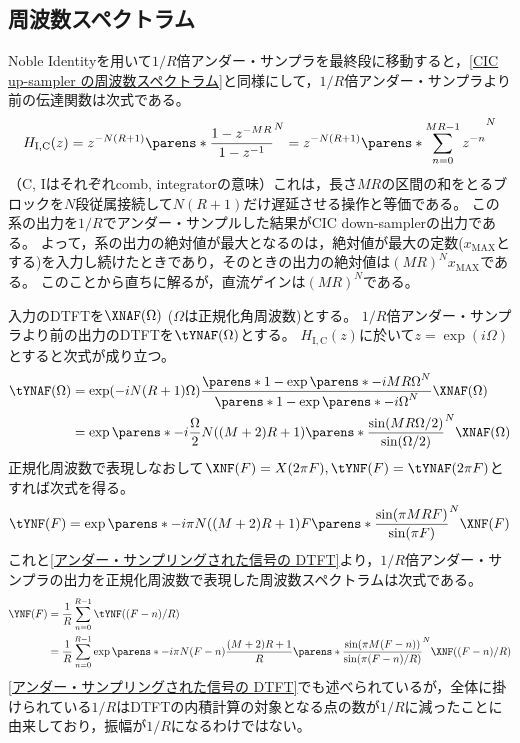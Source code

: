     \subsection{周波数スペクトラム}
        Noble Identityを用いて$1/R$倍アンダー・サンプラを最終段に移動すると，\ref{CIC up-sampler の周波数スペクトラム}と同様にして，$1/R$倍アンダー・サンプラより前の伝達関数は次式である。
        \[ H_\mathrm{I,C}(z) = z^{-N(R+1)}\parens*{\frac{1-z^{-MR}}{1-z^{-1}}}^N = z^{-N(R+1)}\parens*{\sum_{n=0}^{MR-1}z^{-n}}^N \]
        （C, Iはそれぞれcomb, integratorの意味）これは，長さ$MR$の区間の和をとるブロックを$N$段従属接続して$N(R+1)$だけ遅延させる操作と等価である。
        この系の出力を$1/R$でアンダー・サンプルした結果がCIC down-samplerの出力である。
        よって，系の出力の絶対値が最大となるのは，絶対値が最大の定数($x_\mathrm{MAX}$とする)を入力し続けたときであり，そのときの出力の絶対値は$(MR)^N x_\mathrm{MAX}$である。
        このことから直ちに解るが，直流ゲインは$(MR)^N$である。
        \par
        入力のDTFTを$\XNAF(\Omega)$ ($\Omega$は正規化角周波数)とする。
        $1/R$倍アンダー・サンプラより前の出力のDTFTを$\tYNAF(\Omega)$とする。
        $H_\mathrm{I,C}(z)$に於いて$z = \exp(i\Omega)$とすると次式が成り立つ。
        \begin{align*}
            \tYNAF(\Omega) &= \exp(-iN(R+1)\Omega)\frac{\parens*{1-\exp\parens*{-iMR\Omega}}^N}{\parens*{1-\exp\parens*{-i\Omega}}^N}\XNAF(\Omega) \\
            &= \exp\parens*{-i\frac{\Omega}{2}N((M+2)R+1)}\parens*{\frac{\sin(MR\Omega/2)}{\sin(\Omega/2)}}^N \XNAF(\Omega)
        \end{align*}
        正規化周波数で表現しなおして$\XNF(F) = X(2\pi F), \tYNF(F) = \tYNAF(2\pi F)$とすれば次式を得る。
        \[ \tYNF(F) = \exp\parens*{-i\pi N((M+2)R+1)F}\parens*{\frac{\sin(\pi MRF)}{\sin(\pi F)}}^N \XNF(F) \]
        これと\ref{アンダー・サンプリングされた信号の DTFT}より，$1/R$倍アンダー・サンプラの出力を正規化周波数で表現した周波数スペクトラムは次式である。
        \begin{align}
            \YNF(F) &= \frac{1}{R}\sum_{n=0}^{R-1} \tYNF((F-n)/R) \nonumber \\
            &= \frac{1}{R}\sum_{n=0}^{R-1} \exp\parens*{-i\pi N(F-n)\frac{(M+2)R+1}{R}}\parens*{\frac{\sin(\pi M(F-n))}{\sin(\pi(F-n)/R)}}^N \XNF((F-n)/R) \label{equation:CIC down-sampler の周波数スペクトラム}
        \end{align}
        \ref{アンダー・サンプリングされた信号の DTFT}でも述べられているが，全体に掛けられている$1/R$はDTFTの内積計算の対象となる点の数が$1/R$に減ったことに由来しており，振幅が$1/R$になるわけではない。
